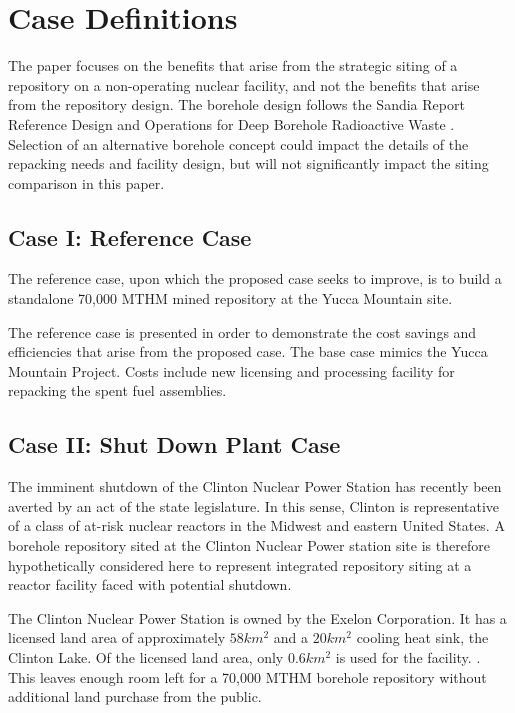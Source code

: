 
\section{Case Definitions}

The paper focuses on the benefits that arise from the strategic siting of a repository 
on a non-operating nuclear facility, and not the benefits that arise from the repository design. 
The borehole design follows the Sandia Report Reference Design and Operations 
for Deep Borehole Radioactive Waste \cite{arnold_reference_2011}. Selection of 
an alternative borehole concept could impact the details of the repacking needs 
and facility design, but will not significantly impact the siting comparison 
in this paper.
 
\subsection{Case I: Reference Case} 
The reference case, upon which the proposed case seeks to improve, is to build 
a standalone 70,000 \gls{MTHM} mined repository at the Yucca Mountain site.

The reference case is presented in order to demonstrate the cost savings and efficiencies 
that arise from the proposed case. The base case mimics the Yucca Mountain Project.
Costs include new licensing and processing facility for repacking the spent fuel assemblies.

\subsection{Case II: Shut Down Plant Case}

The imminent shutdown of the Clinton Nuclear Power Station has recently been 
averted by an act of the state legislature. In this sense, Clinton is 
representative of a class of at-risk nuclear 
reactors in the Midwest and eastern United States. A borehole repository 
sited at the Clinton Nuclear Power station site is therefore hypothetically 
considered here to represent integrated repository siting at a reactor facility 
faced with potential shutdown.

The Clinton Nuclear Power Station is owned by the Exelon Corporation. It has a 
licensed land area of approximately $58 km^2$ and a $20 km^2$ cooling heat sink, 
the Clinton Lake. Of the licensed land area, only $0.6 km^2$ is used for the facility.  
\cite{nrc_chapter_2007}.  This leaves enough room left for a 70,000 \gls{MTHM} 
borehole repository without additional land purchase from the public.


